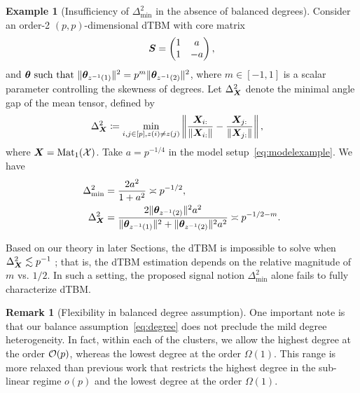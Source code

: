 \documentclass[journal]{IEEEtran}
\theoremstyle{definition}
\theoremstyle{definition}
\newtheorem{example}{Example}
\newtheorem{rmk}{Remark}
\begin{document}
\begin{example}[Insufficiency of $\Delta_{\min}^2$ in the absence of balanced degrees] Consider an order-2 $(p,p)$-dimensional dTBM with core matrix
\begin{equation}\label{eq:modelexample}
    \mS = \begin{pmatrix} 1 &a\\
    1 & -a
    \end{pmatrix}, 
\end{equation}
and $ \boldsymbol{\theta} \text{ such that } \lVert\boldsymbol{\theta}_{z^{-1}(1)}\rVert^2 = p^m \lVert\boldsymbol{\theta}_{z^{-1}(2)}\rVert^2$,
where {$m \in [-1,1]$} is a scalar parameter controlling the skewness of degrees. Let $\Delta_{\bm X}^2$ denote the minimal angle gap of the mean tensor, defined by
\begin{equation}\label{eq:delta_x}
    \Delta_{\mX}^2 \coloneqq \min_{i,j \in [p], z(i) \neq z(j)} \onorm{ \frac{\mX_{i:}}{\onormSize{}{\mX_{i:}}}  -  \frac{\mX_{j:}}{\onormSize{}{\mX_{j:}}}  }, \quad %
\end{equation}
where $ \bm X = \text{Mat}_1(\mathcal{X})$.
Take $ a = p^{-1/4}$ in the model setup~\eqref{eq:modelexample}. We have 
\begin{align}
    \Delta_{\min}^2 &= \frac{2 a^2}{1 + a^2} \asymp p^{-1/2}, \quad  \\
    \Delta_{\bm X}^2 & = \frac{2\lVert\boldsymbol{\theta}_{z^{-1}(2)}\rVert^{2} a^2}{\lVert\boldsymbol{\theta}_{z^{-1}(1)}\rVert^{2} +  \lVert\boldsymbol{\theta}_{z^{-1}(2)}\rVert^{2}a^2} \asymp p^{-1/2-m}.
\end{align}

{Based on our theory in later Sections, the dTBM is impossible to solve when $\Delta^2_{\bm X} \lesssim p^{-1}$
}; that is, the dTBM estimation depends on the relative magnitude of $m$ vs. $1/2$. In such a setting, the proposed signal notion $\Delta^2_{\min}$ alone fails to fully characterize dTBM. 
\end{example}

\begin{rmk}[Flexibility in balanced degree assumption] One important note is that our balance assumption~\eqref{eq:degree} does not preclude the mild degree heterogeneity. In fact, within each of the clusters, we allow the highest degree at the order $\mathcal{O}(p)$, whereas the lowest degree at the order $\Omega(1)$. This range is more relaxed than previous work \citep{gao2018community} that restricts the highest degree in the sub-linear regime $o(p)$ and the lowest degree at the order $\Omega(1)$. 
\end{rmk}
\end{document}
